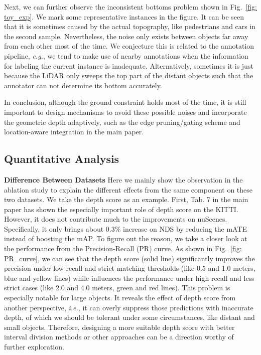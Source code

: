 Next, we can further observe the inconsistent bottoms problem shown in Fig.~\ref{fig: toy_exp}. We mark some representative instances in the figure. It can be seen that it is sometimes caused by the actual topography, like pedestrians and cars in the second sample. Nevertheless, the noise only exists between objects far away from each other most of the time. We conjecture this is related to the annotation pipeline, \emph{e.g.}, we tend to make use of nearby annotations when the information for labeling the current instance is inadequate. Alternatively, sometimes it is just because the LiDAR only sweeps the top part of the distant objects such that the annotator can not determine its bottom accurately.

In conclusion, although the ground constraint holds most of the time, it is still important to design mechanisms to avoid these possible noises and incorporate the geometric depth adaptively, such as the edge pruning/gating scheme and location-aware integration in the main paper.

\vspace{-0.5ex}
\subsection{Quantitative Analysis}
\vspace{-0.5ex}
\noindent\textbf{Difference Between Datasets}\label{sec: PR_curve}\quad
Here we mainly show the observation in the ablation study to explain the different effects from the same component on these two datasets. We take the depth score as an example. First, Tab. 7 in the main paper has shown the especially important role of depth score on the KITTI. However, it does not contribute much to the improvements on nuScenes. Specifically, it only brings about 0.3\% increase on NDS by reducing the mATE instead of boosting the mAP. To figure out the reason, we take a closer look at the performance from the Precision-Recall (PR) curve. As shown in Fig.~\ref{fig: PR_curve}, we can see that the depth score (solid line) significantly improves the precision under low recall and strict matching thresholds (like 0.5 and 1.0 meters, blue and yellow lines) while influences the performance under high recall and less strict cases (like 2.0 and 4.0 meters, green and red lines). This problem is especially notable for large objects. It reveals the effect of depth score from another perspective, \emph{i.e.}, it can overly suppress those predictions with inaccurate depth, of which we should be tolerant under some circumstances, like distant and small objects. Therefore, designing a more suitable depth score with better interval division methods or other approaches can be a direction worthy of further exploration.

